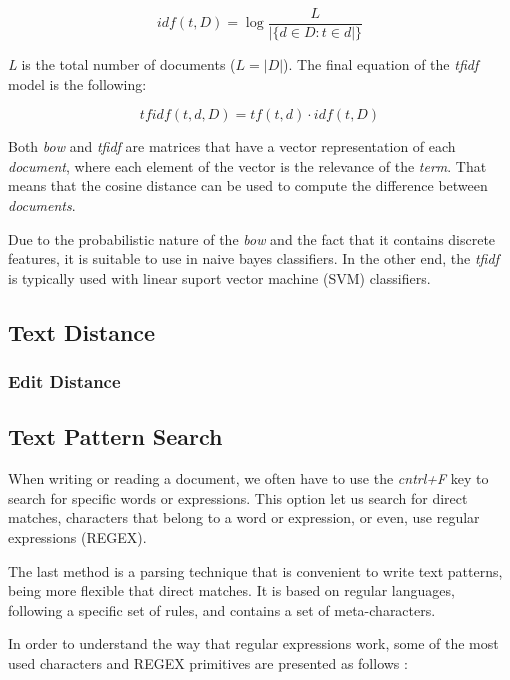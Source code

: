 \begin{equation}
\label{eq:idf}
    idf(t, D) = \log{\frac{L}{|\{d \in D: t \in d|\}}}
\end{equation}

\textit{L} is the total number of documents ($L = |D|$). The final equation of the \textit{tfidf} model is the following:

\begin{equation}
\label{eq:tfidf}
    tfidf(t, d, D) = tf(t, d) \cdot idf(t, D) 
\end{equation}

Both \textit{bow} and \textit{tfidf} are matrices that have a vector representation of each \textit{document}, where each element of the vector is the relevance of the \textit{term}. That means that the cosine distance can be used to compute the difference between \textit{documents}.
\par
Due to the probabilistic nature of the \textit{bow} and the fact that it contains discrete features, it is suitable to use in naive bayes classifiers. In the other end, the \textit{tfidf} is typically used with linear suport vector machine (SVM) classifiers.

\subsection{Text Distance}

\subsubsection{Edit Distance}

\subsection{Text Pattern Search}




When writing or reading a document, we often have to use the \textit{cntrl+F} key to search for specific words or expressions. This option let us search for direct matches, characters that belong to a word or expression, or even, use regular expressions (REGEX).
\par
The last method is a parsing technique that is convenient to write text patterns, being more flexible that direct matches. It is based on regular languages, following a specific set of rules, and contains a set of meta-characters.
\par
In order to understand the way that regular expressions work, some of the most used characters and REGEX primitives are presented as follows \citep{regex2}:

